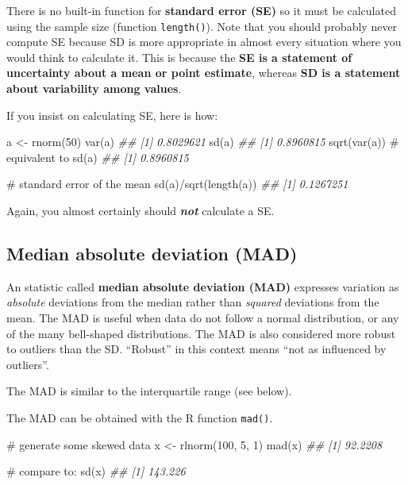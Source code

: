 \documentclass[
  13,
  letterpaper,
]{report}
\newenvironment{Shaded}{\begin{snugshade}}{\end{snugshade}}
\newcommand{\CommentTok}[1]{\textcolor[rgb]{0.37,0.37,0.37}{#1}}
\newcommand{\DecValTok}[1]{\textcolor[rgb]{0.68,0.00,0.00}{#1}}
\newcommand{\DocumentationTok}[1]{\textcolor[rgb]{0.37,0.37,0.37}{\textit{#1}}}
\newcommand{\FunctionTok}[1]{\textcolor[rgb]{0.28,0.35,0.67}{#1}}
\newcommand{\NormalTok}[1]{\textcolor[rgb]{0.00,0.23,0.31}{#1}}
\newcommand{\OtherTok}[1]{\textcolor[rgb]{0.00,0.23,0.31}{#1}}
\newcommand{\SpecialCharTok}[1]{\textcolor[rgb]{0.37,0.37,0.37}{#1}}
\begin{document}
There is no built-in function for \textbf{standard error (SE)} so it
must be calculated using the sample size (function \texttt{length()}).
Note that you should probably never compute SE because SD is more
appropriate in almost every situation where you would think to calculate
it. This is because the \textbf{SE is a statement of uncertainty about a
mean or point estimate}, whereas \textbf{SD is a statement about
variability among values}.

If you insist on calculating SE, here is how:

\begin{Shaded}
\begin{Highlighting}[]

\NormalTok{a }\OtherTok{\textless{}{-}} \FunctionTok{rnorm}\NormalTok{(}\DecValTok{50}\NormalTok{)}
\FunctionTok{var}\NormalTok{(a)}
\DocumentationTok{\#\# [1] 0.8029621}
\FunctionTok{sd}\NormalTok{(a)}
\DocumentationTok{\#\# [1] 0.8960815}
\FunctionTok{sqrt}\NormalTok{(}\FunctionTok{var}\NormalTok{(a)) }\CommentTok{\# equivalent to sd(a)}
\DocumentationTok{\#\# [1] 0.8960815}

\CommentTok{\# standard error of the mean}
\FunctionTok{sd}\NormalTok{(a)}\SpecialCharTok{/}\FunctionTok{sqrt}\NormalTok{(}\FunctionTok{length}\NormalTok{(a))}
\DocumentationTok{\#\# [1] 0.1267251}
\end{Highlighting}
\end{Shaded}

Again, you almost certainly should \textbf{\emph{not}} calculate a SE.

\subsection{Median absolute deviation (MAD)}\label{sec-06-var-mad}

An statistic called \textbf{median absolute deviation (MAD)} expresses
variation as \emph{absolute} deviations from the median rather than
\emph{squared} deviations from the mean. The MAD is useful when data do
not follow a normal distribution, or any of the many bell-shaped
distributions. The MAD is also considered more robust to outliers than
the SD. ``Robust'' in this context means ``not as influenced by
outliers''.

The MAD is similar to the interquartile range (see below).

The MAD can be obtained with the R function \texttt{mad()}.

\begin{Shaded}
\begin{Highlighting}[]
\CommentTok{\# generate some skewed data}
\NormalTok{x }\OtherTok{\textless{}{-}} \FunctionTok{rlnorm}\NormalTok{(}\DecValTok{100}\NormalTok{, }\DecValTok{5}\NormalTok{, }\DecValTok{1}\NormalTok{)}
\FunctionTok{mad}\NormalTok{(x)}
\DocumentationTok{\#\# [1] 92.2208}

\CommentTok{\# compare to:}
\FunctionTok{sd}\NormalTok{(x)}
\DocumentationTok{\#\# [1] 143.226}
\end{Highlighting}
\end{Shaded}
\end{document}
